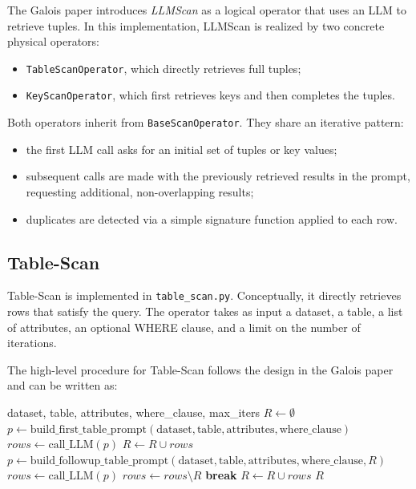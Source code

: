 \documentclass[11pt]{article}
\begin{document}
The Galois paper introduces \emph{LLMScan} as a logical operator that uses an LLM to retrieve tuples. In this implementation, LLMScan is realized by two concrete physical operators:

\begin{itemize}
  \item \texttt{TableScanOperator}, which directly retrieves full tuples;
  \item \texttt{KeyScanOperator}, which first retrieves keys and then completes the tuples.
\end{itemize}

Both operators inherit from \texttt{BaseScanOperator}. They share an iterative pattern:

\begin{itemize}
  \item the first LLM call asks for an initial set of tuples or key values;
  \item subsequent calls are made with the previously retrieved results in the prompt, requesting additional, non-overlapping results;
  \item duplicates are detected via a simple signature function applied to each row.
\end{itemize}

\subsection{Table-Scan}

Table-Scan is implemented in \texttt{table\_scan.py}. Conceptually, it directly retrieves rows that satisfy the query. The operator takes as input a dataset, a table, a list of attributes, an optional WHERE clause, and a limit on the number of iterations.

The high-level procedure for Table-Scan follows the design in the Galois paper and can be written as:

\begin{algorithm}[h]
\caption{Table-Scan}
\begin{algorithmic}[1]
\Require dataset, table, attributes, where\_clause, max\_iters
\State $R \gets \emptyset$ 
\State $p \gets \text{build\_first\_table\_prompt}(\text{dataset}, \text{table}, \text{attributes}, \text{where\_clause})$
\State $rows \gets \text{call\_LLM}(p)$
\State $R \gets R \cup rows$
  \State $p \gets \text{build\_followup\_table\_prompt}(\text{dataset}, \text{table}, \text{attributes}, \text{where\_clause}, R)$
  \State $rows \gets \text{call\_LLM}(p)$
  \State $rows \gets rows \setminus R$ 
    \State \textbf{break}
  \EndIf
  \State $R \gets R \cup rows$
\EndFor
\State \Return $R$
\end{algorithmic}
\end{algorithm}
\end{document}
